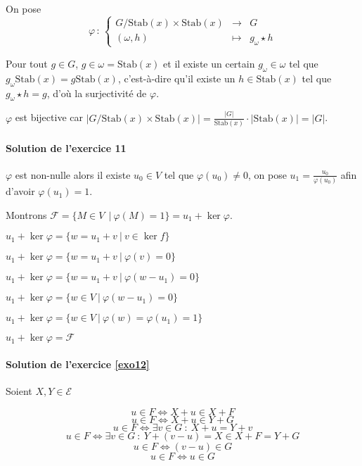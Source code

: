 \documentclass[]{article}
\theoremstyle{remark}
\theoremstyle{definition}
\newcommand{\func}[5]{
#1 \, : \, \left\{ \begin{array}{lcl}
	#2 & \longrightarrow & #3 \\
	#4 & \longmapsto & #5
\end{array}
\right.
}
\begin{document}
On pose $$\func{\varphi}{G/\text{Stab}(x) \times \text{Stab}(x)}{G}{(\omega, h)}{g_\omega \star h}$$

Pour tout $g \in G$, $g \in \omega = \text{Stab}(x)$ et il existe un certain $g_\omega \in \omega$ tel que $g_\omega \text{Stab}(x) = g \text{Stab}(x)$, c'est-à-dire qu'il existe un $h \in \text{Stab}(x)$ tel que $g_\omega \star h = g$, d'où la surjectivité de $\varphi$.

$\varphi$ est bijective car $\left|G / \text{Stab}(x) \times \text{Stab}(x)\right| = \frac{|G|}{\text{Stab}(x)} \cdot |\text{Stab}(x)| = |G|$.

\paragraph{Solution de l'exercice 11}

$\varphi$ est non-nulle alors il existe $u_0 \in V$ tel que $\varphi(u_0) \neq 0$, on pose $u_1 = \frac{u_0}{\varphi(u_0)}$ afin d'avoir $\varphi(u_1) = 1$.

Montrons $\mathcal{F} = \{M \in V\ ~ | ~ \varphi(M) = 1\} = u_1 + \ker \varphi$.

$u_1 + \ker \varphi = \{w = u_1 + v ~ | ~ v \in \ker f\}$

$u_1 + \ker \varphi = \{w = u_1 + v ~ | ~  \varphi(v) = 0\}$

$u_1 + \ker \varphi = \{w = u_1 + v ~ | ~ \varphi(w - u_1) = 0\}$

$u_1 + \ker \varphi = \{w \in V ~ | ~ \varphi(w - u_1) = 0\}$

$u_1 + \ker \varphi = \{w \in V ~ | ~ \varphi(w) = \varphi(u_1) = 1\}$

$u_1 + \ker \varphi = \mathcal{F}$

\paragraph{Solution de l'exercice \ref{exo12}}

Soient $X, Y \in \mathcal{E}$

$$u \in F \Longleftrightarrow X + u \in X + F$$
$$u \in F \Longleftrightarrow X + u \in Y + G$$
$$u \in F \Longleftrightarrow \exists v \in G ~ : ~ X + u = Y + v$$
$$u \in F \Longleftrightarrow \exists v \in G ~ : ~ Y + (v - u) = X \in X + F = Y + G$$
$$u \in F \Longleftrightarrow (v - u) \in G$$
$$u\in F \Longleftrightarrow u \in G$$
\end{document}
